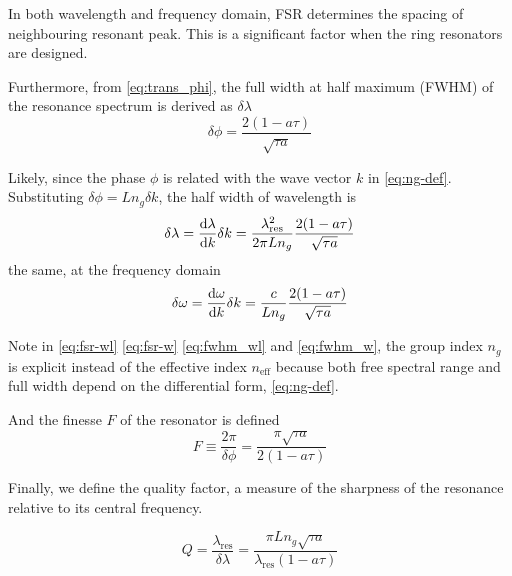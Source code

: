 In both wavelength and frequency domain, FSR determines the spacing of neighbouring resonant peak. This is a significant factor when the ring resonators are designed.

Furthermore, from \autoref{eq:trans_phi}, the full width at half maximum (FWHM) of the resonance spectrum is derived as $\delta\lambda$
\begin{equation}\label{eq:fwhm_phi}
    \delta\phi = \frac{2(1- a \tau)}{\sqrt{\tau a}}
\end{equation}
\begin{figure}
    \centering
    
    \label{fig:my_label}
\end{figure}

Likely, since the phase $\phi$ is related with the wave vector $k$ in \autoref{eq:ng-def}. Substituting $\delta \phi = L n_g \delta k$, the half width of wavelength is
\begin{equation}
    \delta \lambda = \dv{\lambda}{k}\delta k = \frac{\lambda_\mathrm{res}^2}{2\pi L n_g} \frac{2(1- a \tau)}{\sqrt{\tau a}} \label{eq:fwhm_wl}
\end{equation}
the same, at the frequency domain
\begin{equation}
    \delta \omega = \dv{\omega}{k}\delta k = \frac{c}{ L n_g} \frac{2(1- a \tau)}{\sqrt{\tau a}} \label{eq:fwhm_w}
\end{equation}

Note in \autoref{eq:fsr-wl} \autoref{eq:fsr-w} \autoref{eq:fwhm_wl} and \autoref{eq:fwhm_w}, the group index $n_g$ is explicit instead of the effective index $n_\mathrm{eff}$ because both free spectral range and full width depend on the differential form, \autoref{eq:ng-def}.

And the finesse $F$ of the resonator is defined 
\begin{equation}
    F \equiv \frac{2\pi}{\delta\phi} = \frac{\pi\sqrt{\tau a}}{2(1- a \tau)}
\end{equation}

Finally, we define the quality factor, a measure of the sharpness of the resonance relative to its central frequency.

\begin{equation}\label{eq:q-def}
    Q = \frac{\lambda_\mathrm{res}}{\delta \lambda} =  \frac{\pi L n_g \sqrt{\tau a}} {\lambda_\mathrm{res} (1- a \tau)}
\end{equation}


